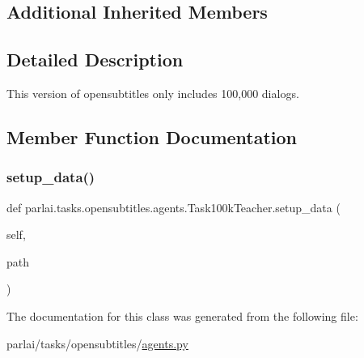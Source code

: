 \subsection*{Additional Inherited Members}


\subsection{Detailed Description}
\begin{DoxyVerb}This version of opensubtitles only includes 100,000 dialogs.
\end{DoxyVerb}
 

\subsection{Member Function Documentation}
\mbox{\label{classparlai_1_1tasks_1_1opensubtitles_1_1agents_1_1Task100kTeacher_ac1bceba11d526547b201f29a15427deb}} 
\subsubsection{\texorpdfstring{setup\+\_\+data()}{setup\_data()}}
{\footnotesize\ttfamily def parlai.\+tasks.\+opensubtitles.\+agents.\+Task100k\+Teacher.\+setup\+\_\+data (\begin{DoxyParamCaption}\item[{}]{self,  }\item[{}]{path }\end{DoxyParamCaption})}



The documentation for this class was generated from the following file\+:\begin{DoxyCompactItemize}
\item 
parlai/tasks/opensubtitles/\hyperlink{parlai_2tasks_2opensubtitles_2agents_8py}{agents.\+py}\end{DoxyCompactItemize}
